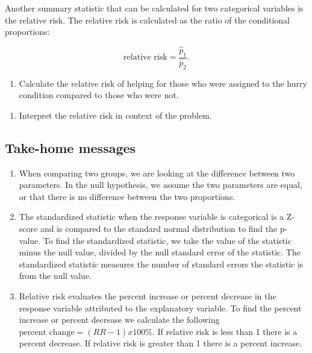 \documentclass[
]{report}
\providecommand{\tightlist}{%
  \setlength{\itemsep}{0pt}\setlength{\parskip}{0pt}}
\begin{document}
Another summary statistic that can be calculated for two categorical variables is the relative risk. The relative risk is calculated as the ratio of the conditional proportions:

\[\text{relative risk} = \frac{\hat{p}_1}{\hat{p}_2}.\]

\begin{enumerate}
\def\labelenumi{\arabic{enumi}.}
\setcounter{enumi}{13}
\tightlist
\item
  Calculate the relative risk of helping for those who were assigned to the hurry condition compared to those who were not.
\end{enumerate}

\vspace{.8in}

\begin{enumerate}
\def\labelenumi{\arabic{enumi}.}
\setcounter{enumi}{14}
\tightlist
\item
  Interpret the relative risk in context of the problem.
\end{enumerate}

\vspace{1in}

\hypertarget{take-home-messages-16}{%
\subsection{Take-home messages}\label{take-home-messages-16}}

\begin{enumerate}
\def\labelenumi{\arabic{enumi}.}
\item
  When comparing two groups, we are looking at the difference between two parameters. In the null hypothesis, we assume the two parameters are equal, or that there is no difference between the two proportions.
\item
  The standardized statistic when the response variable is categorical is a Z-score and is compared to the standard normal distribution to find the p-value. To find the standardized statistic, we take the value of the statistic minus the null value, divided by the null standard error of the statistic. The standardized statistic measures the number of standard errors the statistic is from the null value.
\item
  Relative risk evaluates the percent increase or percent decrease in the response variable attributed to the explanatory variable. To find the percent increase or percent decrease we calculate the following \(\text{percent change}=(RR - 1)x100\%\). If relative risk is less than 1 there is a percent decrease. If relative risk is greater than 1 there is a percent increase.
\end{enumerate}
\end{document}
